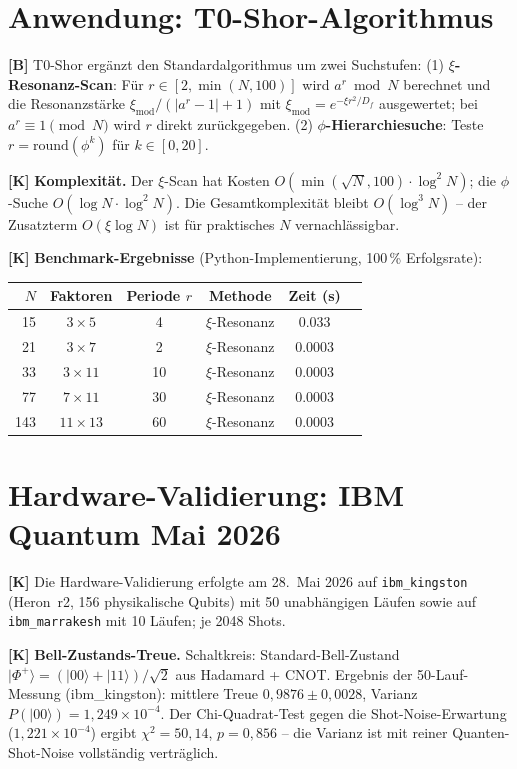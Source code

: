 \section{Anwendung: T0-Shor-Algorithmus}

\textbf{[B]} T0-Shor ergänzt den Standardalgorithmus um zwei Suchstufen: (1)
\textbf{$\xi$-Resonanz-Scan}: Für $r\in[2,\min(N,100)]$ wird
$a^r\bmod N$ berechnet und die Resonanzstärke
$\xi_\text{mod}/(\lvert a^r-1\rvert+1)$ mit $\xi_\text{mod}=e^{-\xi r^2/D_f}$
ausgewertet; bei $a^r\equiv1\pmod N$ wird $r$ direkt zurückgegeben. (2)
\textbf{$\phi$-Hierarchiesuche}: Teste $r=\text{round}(\phi^k)$ für
$k\in[0,20]$.

\textbf{[K]} \textbf{Komplexität.} Der $\xi$-Scan hat Kosten
$O(\min(\sqrt N,100)\cdot\log^2N)$; die $\phi$-Suche $O(\log N\cdot\log^2N)$.
Die Gesamtkomplexität bleibt $O(\log^3N)$ -- der Zusatzterm
$O(\xi\log N)$ ist für praktisches $N$ vernachlässigbar.

\textbf{[K]} \textbf{Benchmark-Ergebnisse} (Python-Implementierung,
100\,\% Erfolgsrate):

\begin{center}
\renewcommand{\arraystretch}{1.3}
{\small
\begin{tabular}{rccccc}
\toprule
$N$ & Faktoren & Periode $r$ & Methode & Zeit (s) \\
\midrule
15  & $3\times5$   &  4 & $\xi$-Resonanz & 0.033 \\
21  & $3\times7$   &  2 & $\xi$-Resonanz & 0.0003 \\
33  & $3\times11$  & 10 & $\xi$-Resonanz & 0.0003 \\
77  & $7\times11$  & 30 & $\xi$-Resonanz & 0.0003 \\
143 & $11\times13$ & 60 & $\xi$-Resonanz & 0.0003 \\
\bottomrule
\end{tabular}
}
\renewcommand{\arraystretch}{1.0}
\end{center}

\section{Hardware-Validierung: IBM Quantum Mai 2026}

\textbf{[K]} Die Hardware-Validierung erfolgte am 28.~Mai 2026 auf
\texttt{ibm\_kingston} (Heron~r2, 156 physikalische Qubits) mit 50 unabhängigen
Läufen sowie auf \texttt{ibm\_marrakesh} mit 10 Läufen; je 2048 Shots.

\textbf{[K]} \textbf{Bell-Zustands-Treue.} Schaltkreis: Standard-Bell-Zustand
$|\Phi^+\rangle=(|00\rangle+|11\rangle)/\sqrt2$ aus Hadamard + CNOT. Ergebnis
der 50-Lauf-Messung (ibm\_kingston): mittlere Treue $0{,}9876\pm0{,}0028$,
Varianz $P(|00\rangle) = 1{,}249\times10^{-4}$. Der Chi-Quadrat-Test gegen die
Shot-Noise-Erwartung ($1{,}221\times10^{-4}$) ergibt $\chi^2=50{,}14$,
$p=0{,}856$ -- die Varianz ist mit reiner Quanten-Shot-Noise vollständig
verträglich.

